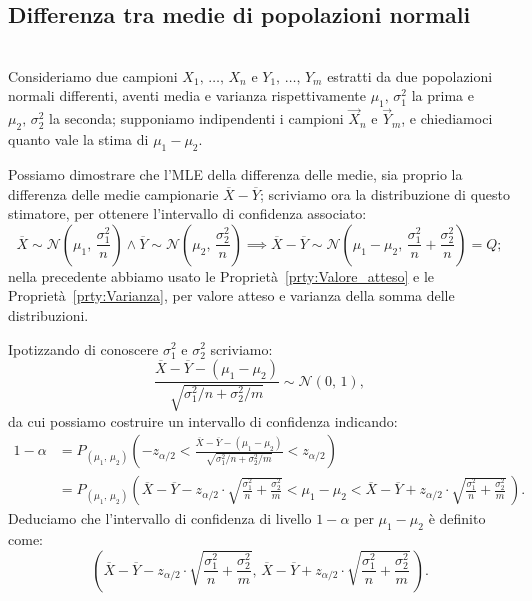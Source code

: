         \subsection{Differenza tra medie di popolazioni normali}
            \begin{defn}[Intervallo bilatero con $\mu_1=\mu_2=\,?,\, \sigma^2_1 = \sigma^2_{1,\,0},\, \sigma^2_2 = \sigma^2_{2,\,0}$]
                \hfill \\
                Consideriamo due campioni $X_1,\, \ldots,\, X_{n}$ e $Y_1,\, \ldots,\, Y_{m}$ estratti da 
                due popolazioni normali differenti, aventi media e varianza rispettivamente 
                $\mu_1,\, \sigma^2_1$ la prima e $\mu_2,\, \sigma^2_2$ la seconda; supponiamo indipendenti 
                i campioni $\vec{X}_n$ e $\vec{Y}_m$, e chiediamoci quanto vale la stima di $\mu_1-\mu_2$.

                Possiamo dimostrare che l'MLE della differenza delle medie, sia proprio la differenza delle 
                medie campionarie $\overline{X}-\overline{Y}$; scriviamo ora la distribuzione di questo 
                stimatore, per ottenere l'intervallo di confidenza associato: \[
                    \overline{X}\sim \mathcal{N}\left(\mu_1,\,\frac{\sigma^2_1}{n}\right) \land 
                    \overline{Y}\sim \mathcal{N}\left(\mu_2,\, \frac{\sigma^2_2}{n}\right) \implies
                    \overline{X}-\overline{Y} \sim \mathcal{N}\left(\mu_1-\mu_2,\, 
                    \frac{\sigma^2_1}{n} + \frac{\sigma^2_2}{n}\right) = Q
                ;\] nella precedente abbiamo usato le Proprietà~\ref{prty:Valore_atteso} e le 
                Proprietà~\ref{prty:Varianza}, per valore atteso e varianza della somma delle 
                distribuzioni.

                Ipotizzando di conoscere $\sigma^2_1$ e $\sigma^2_2$ scriviamo: \[
                    \frac{\overline{X}-\overline{Y}- (\mu_1-\mu_2)}{\sqrt{\sigma^2_1 /n +\sigma^2_2 /m}} 
                    \sim \mathcal{N}(0,\,1)
                ,\] da cui possiamo costruire un intervallo di confidenza indicando:
                \begin{align*}
                    1-\alpha &= P_{(\mu_1,\,\mu_2)}\left(-z_{\alpha /2} < 
                    \frac{\overline{X}-\overline{Y}- (\mu_1-\mu_2)}{\sqrt{\sigma^2_1 /n +\sigma^2_2 /m}} < 
                    z_{\alpha /2}\right) \\
                             &= P_{(\mu_1,\,\mu_2)}\left(\overline{X}-\overline{Y}-z_{\alpha /2}\cdot \sqrt{\frac{\sigma^2_1}{n}+ \frac{\sigma^2_2}{m}}  < \mu_1-\mu_2 < \overline{X}-\overline{Y}+z_{\alpha /2}\cdot \sqrt{\frac{\sigma^2_1}{n} +\frac{\sigma^2_2}{m}}\,\right)
                .\end{align*}
                Deduciamo che l'intervallo di confidenza di livello $1-\alpha$ per $\mu_1-\mu_2$ è definito 
                come: \[
                    \left(\overline{X}-\overline{Y}-z_{\alpha /2}\cdot \sqrt{\frac{\sigma^2_1}{n}+ \frac{\sigma^2_2}{m}},\, \overline{X}-\overline{Y}+z_{\alpha /2}\cdot \sqrt{\frac{\sigma^2_1}{n} +\frac{\sigma^2_2}{m}}\,\right)
                .\] 
            \end{defn}
